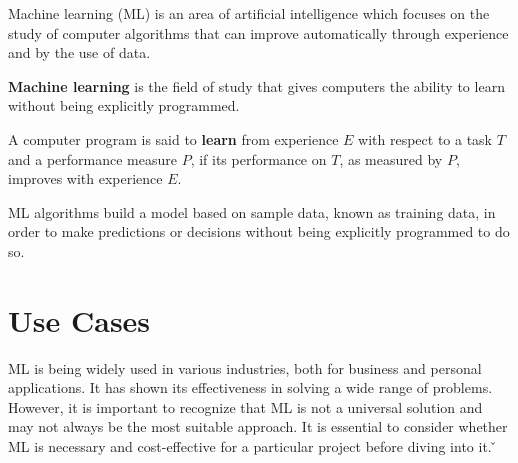 Machine learning (ML) is an area of artificial intelligence which focuses on the study of computer algorithms that can
improve automatically through experience and by the use of data.

\textbf{Machine learning} is the field of study that gives computers the ability to learn without being explicitly
programmed.
\ed

A computer program is said to \textbf{learn} from experience $E$ with respect to a task $T$ and a performance measure
$P$, if its performance on $T$, as measured by $P$, improves with experience $E$.
\ed

ML algorithms build a model based on sample data, known as training data, in order to make predictions or decisions
without being explicitly programmed to do so.

\section{Use Cases}

ML is being widely used in various industries, both for business and personal applications. It has shown its
effectiveness in solving a wide range of problems. However, it is important to recognize that ML is not a universal
solution and may not always be the most suitable approach. It is essential to consider whether ML is necessary and
cost-effective for a particular project before diving into it. \v

